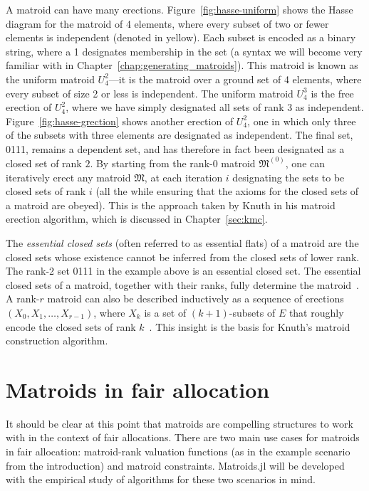 A matroid can have many erections. Figure~\ref{fig:hasse-uniform} shows the Hasse diagram for the matroid of 4 elements, where every subset of two or fewer elements is independent (denoted in yellow). Each subset is encoded as a binary string, where a 1 designates membership in the set (a syntax we will become very familiar with in Chapter~\ref{chap:generating_matroids}). This matroid is known as the uniform matroid $U_4^2$---it is the matroid over a ground set of 4 elements, where every subset of size 2 or less is independent. The uniform matroid $U_4^3$ is the free erection of $U_4^2$, where we have simply designated all sets of rank 3 as independent. Figure~\ref{fig:hasse-grection} shows another erection of $U_4^2$, one in which only three of the subsets with three elements are designated as independent. The final set, 0111, remains a dependent set, and has therefore in fact been designated as a closed set of rank $2$. By starting from the rank-0 matroid $\mathfrak{M}^{(0)}$, one can iteratively erect any matroid $\mathfrak{M}$, at each iteration $i$ designating the sets to be closed sets of rank $i$ (all the while ensuring that the axioms for the closed sets of a matroid are obeyed). This is the approach taken by Knuth in his matroid erection algorithm, which is discussed in Chapter~\ref{sec:kmc}.

The \textit{essential closed sets} (often referred to as essential flats) of a matroid are the closed sets whose existence cannot be inferred from the closed sets of lower rank. The rank-2 set 0111 in the example above is an essential closed set. The essential closed sets of a matroid, together with their ranks, fully determine the matroid~\cite{kelly-1978}. A rank-$r$ matroid can also be described inductively as a sequence of erections $(X_0, X_1, \dots, X_{r-1})$, where $X_k$ is a set of $(k+1)$-subsets of $E$ that roughly encode the closed sets of rank $k$~\cite{pendavingh2016enumerating}. This insight is the basis for Knuth's matroid construction algorithm.


\section{Matroids in fair allocation}
It should be clear at this point that matroids are compelling structures to work with in the context of fair allocations. There are two main use cases for matroids in fair allocation: matroid-rank valuation functions (as in the example scenario from the introduction) and matroid constraints. Matroids.jl will be developed with the empirical study of algorithms for these two scenarios in mind.

